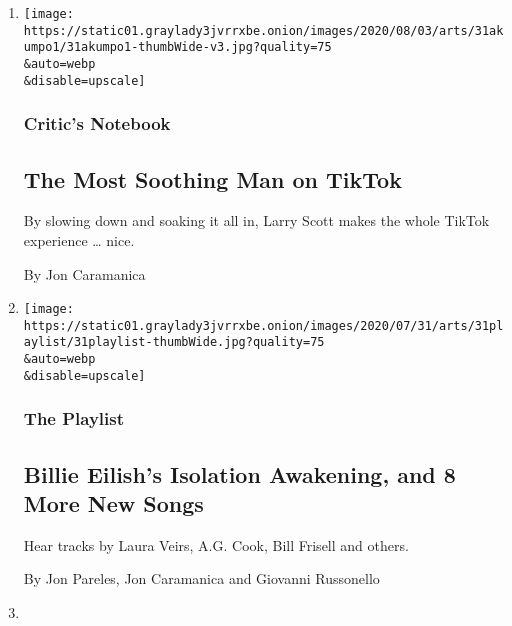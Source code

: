 \begin{enumerate}
\def\labelenumi{\arabic{enumi}.}
\item
  \href{/2020/07/31/arts/larry-scott-tiktok-larryakumpo.html}{}

  \texttt{[image: https://static01.graylady3jvrrxbe.onion/images/2020/08/03/arts/31akumpo1/31akumpo1-thumbWide-v3.jpg?quality=75\\\&auto=webp\\\&disable=upscale]}

  \hypertarget{critics-notebook}{%
  \subsubsection{Critic's Notebook}\label{critics-notebook}}

  \hypertarget{the-most-soothing-man-on-tiktok}{%
  \subsection{The Most Soothing Man on
  TikTok}\label{the-most-soothing-man-on-tiktok}}

  By slowing down and soaking it all in, Larry Scott makes the whole
  TikTok experience \ldots{} nice.

  By Jon Caramanica
\item
  \href{/2020/07/31/arts/music/playlist-billie-eilish-snakehips-a-boogie.html}{}

  \texttt{[image: https://static01.graylady3jvrrxbe.onion/images/2020/07/31/arts/31playlist/31playlist-thumbWide.jpg?quality=75\\\&auto=webp\\\&disable=upscale]}

  \hypertarget{the-playlist}{%
  \subsubsection{The Playlist}\label{the-playlist}}

  \hypertarget{billie-eilishs-isolation-awakening-and-8-more-new-songs}{%
  \subsection{Billie Eilish's Isolation Awakening, and 8 More New
  Songs}\label{billie-eilishs-isolation-awakening-and-8-more-new-songs}}

  Hear tracks by Laura Veirs, A.G. Cook, Bill Frisell and others.

  By Jon Pareles, Jon Caramanica and Giovanni Russonello
\item
  \href{/2020/07/26/arts/music/taylor-swift-folklore-review.html}{}


\end{enumerate}
